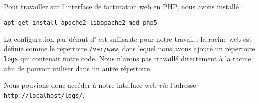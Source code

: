 \subsection{\apa}

Pour travailler sur l’interface de facturation web en PHP, nous avons installé {\apa} :

\begin{verbatim}
apt-get install apache2 libapache2-mod-php5
\end{verbatim}

La configuration par défaut d’{\apa} est suffisante pour notre travail : la racine web est définie comme le répertoire \texttt{/var/www}, dans lequel nous avons ajouté un répertoire \texttt{logs} qui contenait notre code. Nous n’avons pas travaillé directement à la racine afin de pouvoir utiliser {\pma} dans un autre répertoire.

Nous pouvions donc accéder à notre interface web \textit{via} l’adresse \texttt{http://localhost/logs/}.
